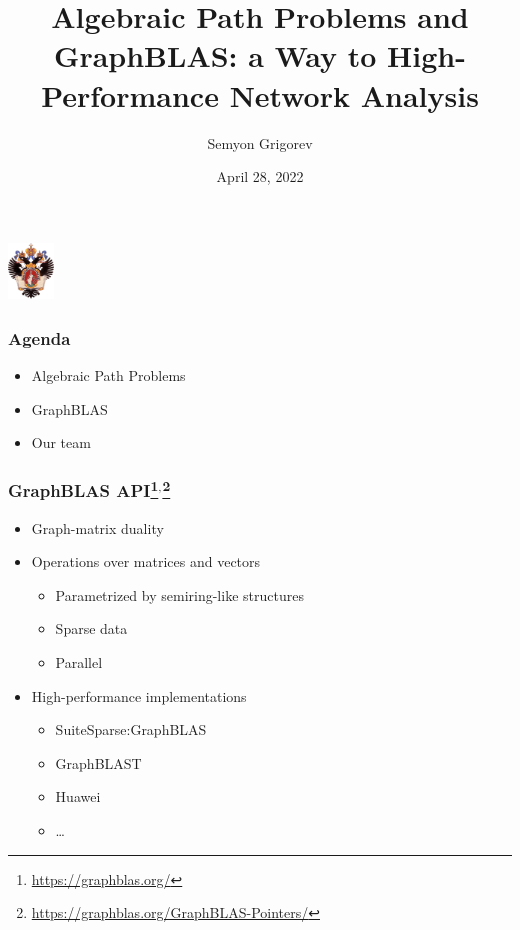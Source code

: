 \documentclass[xcolor=table,aspectratio=169]{beamer}
\title[Algebraic Path Problems \& GraphBLAS]{Algebraic Path Problems and GraphBLAS: a Way to High-Performance Network Analysis}
\institute[PL\&T@SPbSU]{
Saint Petersburg State University
}
\author[Semyon Grigorev]{Semyon Grigorev}
\date{April 28, 2022}
\begin{document}
{
\begin{frame}[fragile]
  \begin{table}
  \centering
  \includegraphics[height=1.5cm]{pictures/SPbGU_Logo.png}
  \end{table}
  \titlepage
\end{frame}
}

\begin{frame}[fragile]
  \frametitle{Agenda}  
  \begin{itemize}
    \item Algebraic Path Problems
    \item GraphBLAS
    \item Our team
  \end{itemize}
\end{frame}


\begin{frame}[fragile]
  \frametitle{GraphBLAS API\footnote{\url{https://graphblas.org/}}$^,$\footnote{\url{https://graphblas.org/GraphBLAS-Pointers/}}}
  \begin{itemize}
    \item Graph-matrix duality
    \item Operations over matrices and vectors
    \begin{itemize}
      \item Parametrized by semiring-like structures
      \item Sparse data
      \item Parallel
    \end{itemize}
    \item High-performance implementations
    \begin{itemize}
      \item SuiteSparse:GraphBLAS
      \item GraphBLAST
      \item Huawei
      \item \ldots
    \end{itemize}
  \end{itemize}
\end{frame}
\end{document}
